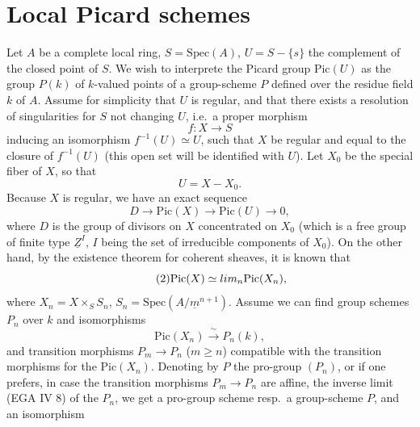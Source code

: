 \documentclass[11pt,a4paper]{article}
\begin{document}
\section{Local Picard schemes}


Let $A$ be a complete local ring, $S = \mathrm{Spec}(A)$, $U = S - \{s\}$ the
complement of the closed point of $S$. We wish to interprete the Picard group
$\mathrm{Pic}(U)$ as the group $P(k)$ of $k$-valued points of a group-scheme
$P$ defined over the residue field $k$ of $A$. Assume for simplicity that $U$
is regular, and that there exists a resolution of singularities for $S$ not
changing $U$, i.e.\ a proper morphism
\[ f \colon X \longrightarrow S \]
inducing an isomorphism $f^{-1}(U) \simeq U$, such that $X$ be regular and
equal to the closure of $f^{-1}(U)$ (this open set will be identified with
$U$). Let $X_0$ be the special fiber of $X$, so that
\[ U = X - X_0 . \]
Because $X$ is regular, we have an exact sequence
\begin{equation*}
\tag{1} D \longrightarrow \mathrm{Pic}(X) \longrightarrow \mathrm{Pic}(U) \longrightarrow 0 ,
\end{equation*}
where $D$ is the group of divisors on $X$ concentrated on $X_0$ (which is a
free group of finite type $\underline{Z}^I$, $I$ being the set of irreducible
components of $X_0$). On the other hand, by the existence theorem for coherent
sheaves, it is known that
\begin{equation*}
\tag{2} \mathrm{Pic}(X) \simeq \varprojlim_n \mathrm{Pic}(X_n) ,
\end{equation*}
where $X_n = X \times_S S_n$, $S_n = \mathrm{Spec}(A/\underline{m}^{n+1})$.
Assume we can find group schemes $P_n$ over $k$ and isomorphisms
\begin{equation*}
\tag{3} \mathrm{Pic}(X_n) \xrightarrow{\ \sim\ } P_n(k) ,
\end{equation*}
and transition morphisms $P_m \to P_n$ ($m \geq n$) compatible with the
transition morphisms for the $\mathrm{Pic}(X_n)$. Denoting by $P$ the
pro-group $(P_n)$, or if one prefers, in case the transition morphisms
$P_m \to P_n$ are affine, the inverse limit (EGA IV 8) of the $P_n$, we get a
pro-group scheme resp.\ a group-scheme $P$, and an isomorphism
\end{document}
